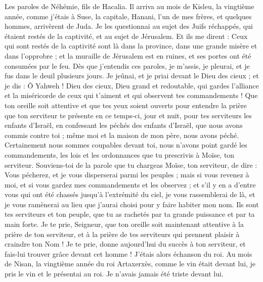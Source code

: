 \begin{multicols}{2}
\VerseOne{}Les paroles de Néhémie, fils de Hacalia. Il arriva au mois de Kisleu, la vingtième année, comme j'étais à Suse, la capitale,
Hanani, l'un de mes frères, et quelques hommes, arrivèrent de Juda. Je les questionnai au sujet des Juifs réchappés, qui étaient restés de la captivité, et au sujet de Jérusalem.
Et ils me dirent : Ceux qui sont restés de la captivité sont là dans la province, dans une grande misère et dans l’opprobre ; et la muraille de Jérusalem est en ruines, et ses portes ont été consumées par le feu.
Dès que j’entendis ces paroles, je m'assis, je pleurai, et je fus dans le deuil plusieurs jours. Je jeûnai, et je priai devant le Dieu des cieux ;
 et je dis : Ô Yahweh ! Dieu des cieux, Dieu grand et redoutable, qui gardes l'alliance et la miséricorde de ceux qui t'aiment et qui observent tes commandements !
Que ton oreille soit attentive et que tes yeux soient ouverts pour entendre la prière que ton serviteur te présente en ce temps-ci, jour et nuit, pour tes serviteurs les enfants d'Israël, en confessant les péchés des enfants d'Israël, que nous avons commis contre toi ; même moi et la maison de mon père, nous avons péché.
Certainement nous sommes coupables devant toi, nous n'avons point gardé les commandements, les lois et les ordonnances que tu prescrivis à Moïse, ton serviteur.
Souviens-toi de la parole que tu chargeas Moïse, ton serviteur, de dire : Vous pécherez, et je vous disperserai parmi les peuples ;
mais si vous revenez à moi, et si vous gardez mes commandements et les observez ; et s'il y en a d'entre vous qui ont été chassés jusqu'à l'extrémité du ciel, je vous rassemblerai de là, et je vous ramènerai au lieu que j'aurai choisi pour y faire habiter mon nom.
Ils sont tes serviteurs et ton peuple, que tu as rachetés par ta grande puissance et par ta main forte.
Je te prie, Seigneur, que ton oreille soit maintenant attentive à la prière de ton serviteur, et à la prière de tes serviteurs qui prennent plaisir à craindre ton Nom ! Je te prie, donne aujourd'hui du succès à ton serviteur, et fais-lui trouver grâce devant cet homme ! J'étais alors échanson du roi.
\VerseOne{}Au mois de Nisan, la vingtième année du roi Artaxerxès, comme le vin était devant lui, je pris le vin et le présentai au roi. Je n'avais jamais été triste devant lui.

\end{multicols}
